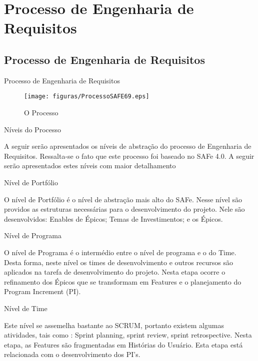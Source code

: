 \part{Processo de Engenharia de Requisitos}

\chapter[Processo de Engenharia de Requisitos]{Processo de Engenharia de Requisitos}
{
	\large{Processo de Engenharia de Requisitos\\}

}


\begin{figure}[h]
    \centering
    \label{fig01}
        \texttt{[image: figuras/ProcessoSAFE69.eps]}
    \caption{O Processo}
\end{figure}


{
	\large{Níveis do Processo\\}

	\tab A seguir serão apresentados os níveis de abstração do processo de Engenharia de Requisitos. Ressalta-se o fato que este processo foi baseado no SAFe 4.0. A seguir serão apresentados estes níveis com maior detalhamento\\ 

}

{
	\large{Nível de Portfólio\\}

	\tab O nível de Portfólio é o nível de abstração mais alto do SAFe. Nesse nível são providos as estruturas necessárias para o desenvolvimento do projeto.  Nele são desenvolvidos: Enables de Épicos; Temas de Investimentos; e os Épicos. \\

}

{
	 \large{Nível de Programa\\}

	 \tab O nível de Programa é o intermédio entre o nível de programa e o do Time. Desta forma, neste nível os times de desenvolvimento e outros recursos são aplicados na tarefa de desenvolvimento do projeto.  Nesta etapa ocorre o refinamento dos Épicos que se transformam em Features e o planejamento do Program Increment (PI).\\
}

{
	\large{Nível de Time\\}

	\tab Este nível se assemelha bastante ao SCRUM,  portanto existem algumas atividades, tais como : Sprint planning, sprint review, sprint retrospective. Nesta etapa, as Features são fragmentadas em Histórias do Usuário. Esta etapa está relacionada com o desenvolvimento dos PI’s. \\
}

